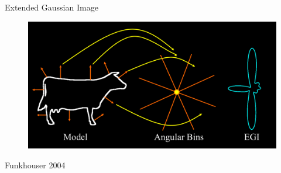 \documentclass{beamer}
\begin{document}
\begin{frame}{Extended Gaussian Image}

\begin{figure}[t]
	\centering
    \includegraphics[width=\textwidth]{EGIOverview.png}
\end{figure}

\small Funkhouser 2004

\end{frame}
\end{document}
